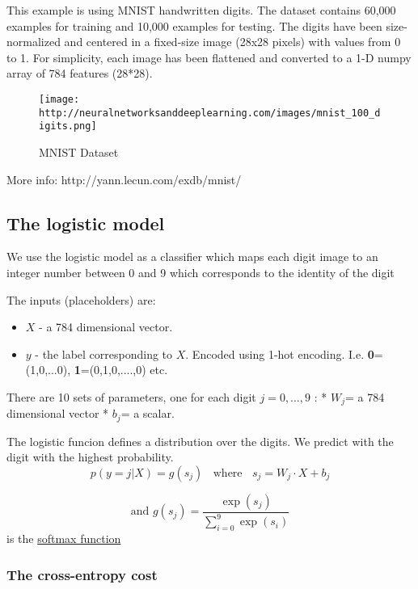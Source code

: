 \documentclass[11pt]{article}
\makeatletter
\def\maxwidth{\ifdim\Gin@nat@width>\linewidth\linewidth
    \else\Gin@nat@width\fi}
\let\Oldincludegraphics\includegraphics
\renewcommand{\includegraphics}[1]{\Oldincludegraphics[width=.8\maxwidth]{#1}}
\providecommand{\tightlist}{%
      \setlength{\itemsep}{0pt}\setlength{\parskip}{0pt}}
\makeatother
\begin{document}
This example is using MNIST handwritten digits. The dataset contains
60,000 examples for training and 10,000 examples for testing. The digits
have been size-normalized and centered in a fixed-size image (28x28
pixels) with values from 0 to 1. For simplicity, each image has been
flattened and converted to a 1-D numpy array of 784 features (28*28).

\begin{figure}
\centering
\texttt{[image: http://neuralnetworksanddeeplearning.com/images/mnist\_100\_digits.png]}
\caption{MNIST Dataset}
\end{figure}

More info: http://yann.lecun.com/exdb/mnist/

    \subsection{The logistic model}\label{the-logistic-model}

We use the logistic model as a classifier which maps each digit image to
an integer number between 0 and 9 which corresponds to the identity of
the digit

    The inputs (placeholders) are:

\begin{itemize}
\tightlist
\item
  \(X\) - a 784 dimensional vector.
\end{itemize}

    \begin{itemize}
\tightlist
\item
  \(y\) - the label corresponding to \(X\). Encoded using 1-hot
  encoding. I.e. \textbf{0}=(1,0,...0), \textbf{1}=(0,1,0,....,0) etc.
\end{itemize}

    There are 10 sets of parameters, one for each digit \(j=0,\ldots,9\) : *
\(W_j\)= a 784 dimensional vector * \(b_j\)= a scalar.

    The logistic funcion defines a distribution over the digits. We predict
with the digit with the highest probability. \[
p(y=j | X) = g(s_j)\;\;\mbox{ where }\;\; s_j=W_j \cdot X +b_j \]

    \[\mbox{and  } g(s_j) = \frac{\exp(s_j)}{\sum_{i=0}^9 \exp(s_i)}
\]is the \href{https://en.wikipedia.org/wiki/softmax_function}{softmax
function}

    \subsubsection{The cross-entropy cost}\label{the-cross-entropy-cost}
\end{document}
